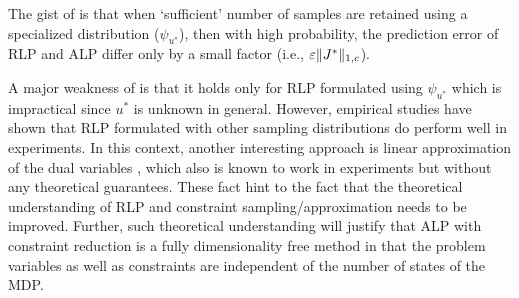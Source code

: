 The gist of  is that when `sufficient' number of samples are retained using a specialized distribution ($\psi_{u^*}$), then with high probability, the prediction error of RLP and ALP differ only by a small factor (i.e., $\varepsilon\|J^*\|_{1,c}$).\par
A major weakness of  is that it holds only for RLP formulated using $\psi_{u^*}$ which is impractical since $u^*$ is unknown in general. However, empirical studies \cite{ALP,CS,CST} have shown that RLP formulated with other sampling distributions do perform well in experiments. In this context, another interesting approach is linear approximation of the dual variables \cite{dolgov}, which also is known to work in experiments but without any theoretical guarantees. These fact hint to the fact that the theoretical understanding of RLP and constraint sampling/approximation needs to be improved. Further, such theoretical understanding will justify that ALP with constraint reduction is a fully dimensionality free method in that the problem variables as well as constraints are independent of the number of states of the MDP.
\begin{comment}
The Generalized Reduced Linear Program is given as:
\begin{align}\label{grlp}
\begin{split}
&\text{GRLP:~}\underset{r\in \N\subset R^k}{\min}\, \, c^\top \Phi r\,\,\,\,\\
&  \,W^\top E\Phi r\geq W^\top H \Phi r.
\end{split}
\end{align}
\end{comment}
